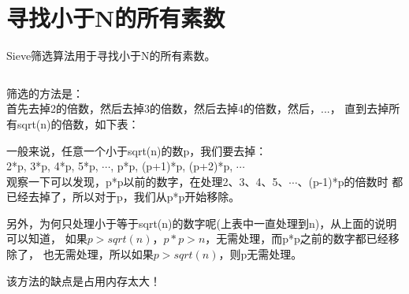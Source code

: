 
\section[寻找小于N的所有素数]{寻找小于N的所有素数}
Sieve筛选算法用于寻找小于N的所有素数。\par
\inputminted[linenos,tabsize=4,bgcolor=srcbg]{cpp}{srcdir/Sieve.c}

筛选的方法是：\\
首先去掉2的倍数，然后去掉3的倍数，然后去掉4的倍数，然后，...，
直到去掉所有sqrt(n)的倍数，如下表：\par
{}

一般来说，任意一个小于sqrt(n)的数p，我们要去掉：\\
2*p, 3*p, 4*p, 5*p, $\cdots$, p*p, (p+1)*p, (p+2)*p, $\cdots$\\
观察一下可以发现，p*p以前的数字，在处理2、3、4、5、$\cdots$、(p-1)*p的倍数时
都已经去掉了，所以对于p，我们从p*p开始移除。

另外，为何只处理小于等于sqrt(n)的数字呢(上表中一直处理到n)，从上面的说明可以知道，
如果$p>sqrt(n)$，$p*p>n$，无需处理，而p*p之前的数字都已经移除了，
也无需处理，所以如果$p>sqrt(n)$，则p无需处理。

该方法的缺点是占用内存太大！